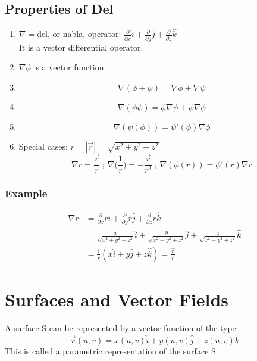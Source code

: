 \documentclass[a4paper, 11pt, normalem]{report}
\newcommand\p{\partial}
\begin{document}
\subsection{Properties of Del}
\begin{enumerate}
    \item $\nabla = $del, or nabla, operator: $\frac{\p}{\p x}\hat{i} + \frac{\p}{\p y}\hat{j} + \frac{\p}{\p z}\hat{k}$ \\
    It is a vector differential operator.
    \item $\nabla\phi$ is a vector function
    \item
            \begin{equation*}
                \nabla(\phi + \psi) = \nabla\phi + \nabla\psi
            \end{equation*}
    \item
            \begin{equation*}
                \nabla(\phi\psi) = \phi\nabla\psi + \psi\nabla\phi
            \end{equation*}
    \item
            \begin{equation*}
                \nabla(\psi(\phi)) = \psi'(\phi)\nabla\phi
            \end{equation*}
    \item Special cases: $r = |\vec{r}| = \sqrt{x^2 + y^2 + z^2}$
            \begin{equation*}
                \nabla r = \frac{\vec{r}}{r} ~;~ \nabla\Big(\frac{1}{r}\Big) = -\frac{\vec{r}}{r^3} ~;~ \nabla(\phi(r)) = \phi'(r)\nabla r
            \end{equation*}
\end{enumerate}

\subsubsection{Example}
\begin{align*}
    \nabla r &= \frac{\p}{\p x}r\hat{i} + \frac{\p}{\p y}r\hat{j} + \frac{\p}{\p z}r\hat{k} \\
    &= \frac{x}{\sqrt{x^2 + y^2 + z^2}}\hat{i} + \frac{y}{\sqrt{x^2 + y^2 + z^2}}\hat{j} + \frac{z}{\sqrt{x^2 + y^2 + z^2}}\hat{k} \\
    &= \frac{1}{r}(x\hat{i} + y\hat{j} + z\hat{k}) = \frac{\vec{r}}{r}
\end{align*}

\section{Surfaces and Vector Fields}
A surface S can be represented by a vector function of the type
\begin{equation*}
    \vec{r}(u,v) = x(u,v)\hat{i} + y(u,v)\hat{j} + z(u,v)\hat{k}
\end{equation*}
This is called a parametric representation of the surface S
\end{document}
